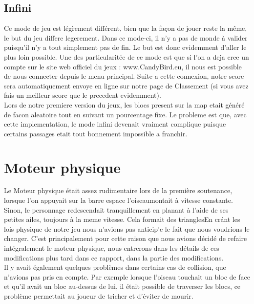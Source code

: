 \documentclass [11pt]{report}
\begin{document}
			\vspace{10mm}
			
			
			
			\subsection{Infini}
			Ce mode de jeu est lég\`rement différent, bien que la façon de jouer reste la m\^eme, le but du jeu differe legerement. Dans ce mode-ci, il n'y a pas de monde \`a valider puisqu'il n'y a tout simplement pas de fin. Le but est donc evidemment d'aller le plus loin possible. Une des particularitée de ce mode est que si l'on a deja cree un compte sur le site web officiel du jeux : www.CandyBird.eu, il nous est possible de nous connecter depuis le menu principal. Suite a cette connexion, notre score sera automatiquement envoye en ligne sur notre page de Classement (si vous avez fais un meilleur score que le precedent evidemment).\\
			
			Lors de notre premiere version du jeux, les blocs present sur la map etait généré de facon aleatoire tout en suivant un pourcentage fixe. Le probleme est que, avec cette implementation, le mode infini devenait vraiment complique puisque certains passages etait tout bonnement impossible a franchir. 
			
			\vspace{10mm}
			
	\section{Moteur physique}
		\indent Le Moteur physique était assez rudimentaire lors de la premi\`ere soutenance, lorsque l'on appuyait sur la barre espace l'oiseaumontait \`a vitesse constante. Sinon, le personnage redescendait tranquillement en planant \`a l'aide de ses petites ailes, toujours \`a la meme vitesse. Cela formait des trianglesEn cr\'ant les lois physique de notre jeu nous n'avions pas anticip'e le fait que nous voudrions le changer. C'est principalement pour cette raison que nous avions décidé de refaire intégralement le moteur physique, nous entrerons dans les détails de ces modifications plus tard dans ce rapport, dans la partie des modifications.\\
		
		\indent Il y avait également quelques probl\`emes dans certains cas de collision, que n'avions pas pris en compte. Par exemple lorsque l'oiseau touchait un bloc de face et qu'il avait un bloc au-dessus de lui, il était possible de traverser les blocs, ce probl\`eme permettait au joueur de tricher et d'éviter de mourir.\\
		
\end{document}
